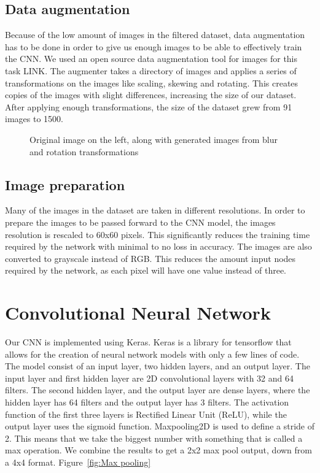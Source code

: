 \subsection{Data augmentation}\label{subsec:data-augmentation}
Because of the low amount of images in the filtered dataset, data augmentation has to be done in order to give us enough images to be able to effectively train the CNN\@.
We used an open source data augmentation tool for images for this task LINK\@.
The augmenter takes a directory of images and applies a series of transformations on the images like scaling, skewing and rotating.
This creates copies of the images with slight differences, increasing the size of our dataset.
After applying enough transformations, the size of the dataset grew from 91 images to 1500.

\begin{figure}[h]
    \caption{Original image on the left, along with generated images from blur and rotation transformations}
    \label{fig:figure4.3}
\end{figure}

\subsection{Image preparation}\label{subsec:imgprep}
Many of the images in the dataset are taken in different resolutions.
In order to prepare the images to be passed forward to the CNN model, the images resolution is rescaled to 60x60 pixels.
This significantly reduces the training time required by the network with minimal to no loss in accuracy.
The images are also converted to grayscale instead of RGB\@.
This reduces the amount input nodes required by the network, as each pixel will have one value instead of three.

\section{Convolutional Neural Network}\label{sec:cnn}

Our CNN is implemented using Keras.
Keras is a library for tensorflow that allows for the creation of neural network models with only a few lines of code.
The model consist of an input layer, two hidden layers, and an output layer.
The input layer and first hidden layer are 2D convolutional layers with 32 and 64 filters.
The second hidden layer, and the output layer are dense layers, where the hidden layer has 64 filters and the output layer has 3 filters.
The activation function of the first three layers is Rectified Linear Unit (ReLU), while the output layer uses the sigmoid function.
Maxpooling2D is used to define a stride of 2.
This means that we take the biggest number with something that is called a max operation.
We combine the results to get a 2x2 max pool output, down from a 4x4 format.
Figure~\ref{fig:Max pooling}

